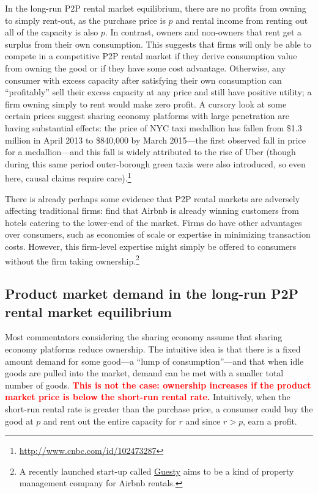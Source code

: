 \documentclass[11pt]{article}
\newcommand{\important}[1]{\textcolor{red}{\textbf{#1}}}
\newcommand{\important}[1]{#1}
\begin{document}
In the long-run P2P rental market equilibrium, there are no profits from owning to simply rent-out, as the purchase price is $p$ and rental income from renting out all of the capacity is also $p$.  
In contrast, owners and non-owners that rent get a surplus from their own consumption. 
This suggests that firms will only be able to compete in a competitive P2P rental market if they derive consumption value from owning the good or if they have some cost advantage.
Otherwise, any consumer with excess capacity after satisfying their own consumption can ``profitably'' sell their excess capacity at any price and still have positive utility; a firm owning simply to rent would make zero profit.
A cursory look at some certain prices suggest sharing economy platforms with large penetration are having substantial effects:  
the price of NYC taxi medallion has fallen from \$1.3 million in April 2013 to \$840,000 by March 2015---the first observed fall in price for a medallion---and this fall is widely attributed to the rise of Uber (though during this same period outer-borough green taxis were also introduced, so even here, causal claims require care).\footnote{
  \url{http://www.cnbc.com/id/102473287}
}

There is already perhaps some evidence that P2P rental markets are adversely affecting traditional firms: 
\cite{byers2013rise} find that Airbnb is already winning customers from hotels catering to the lower-end of the market. 
Firms do have other advantages over consumers, such as economies of scale or expertise in minimizing transaction costs. 
However, this firm-level expertise might simply be offered to consumers without the firm taking ownership.\footnote{
  A recently launched start-up called \href{https://www.guesty.com/}{Guesty} aims to be a kind of property management company for Airbnb rentals.
} 

\subsection{Product market demand in the long-run P2P rental market equilibrium} 
Most commentators considering the sharing economy assume that sharing economy platforms reduce ownership. 
The intuitive idea is that there is a fixed amount demand for some good---a ``lump of consumption''---and that when idle goods are pulled into the market, demand can be met with a smaller total number of goods.
\important{This is not the case:  
ownership increases if the product market price is below the short-run rental rate.} 
Intuitively, when the short-run rental rate is greater than the purchase price, a consumer could buy the good at $p$ and rent out the entire capacity for $r$ and since $r > p$, earn a profit. 
\end{document}
